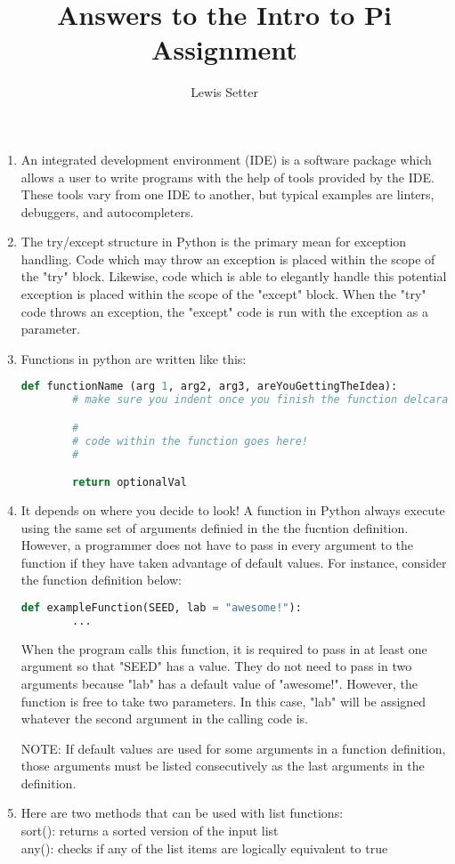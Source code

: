 \documentclass{article}
\title{Answers to the Intro to Pi Assignment}
\author{Lewis Setter}
\begin{document}
\maketitle

\begin{enumerate}
\item
An integrated development environment (IDE) is a software package which allows a user
to write programs with the help of tools provided by the IDE. These tools vary from
one IDE to another, but typical examples are linters, debuggers, and autocompleters.

\item
The try/except structure in Python is the primary mean for exception handling. Code 
which may throw an exception is placed within the scope of the "try" block. Likewise,
code which is able to elegantly handle this potential exception is placed within the 
scope of the "except" block. When the "try" code throws an exception, the "except"
code is run with the exception as a parameter.

\item
Functions in python are written like this:
\begin{lstlisting}[language=Python]
    def functionName (arg 1, arg2, arg3, areYouGettingTheIdea):
        # make sure you indent once you finish the function delcaration

        #
        # code within the function goes here!
        #

        return optionalVal
\end{lstlisting}
\item
It depends on where you decide to look!
A function in Python always execute using the same set of arguments definied in the
the fucntion definition. However, a programmer does not have to pass in every argument
to the function if they have taken advantage of default values. For instance, consider
the function definition below:
\begin{lstlisting}[language=Python]
    def exampleFunction(SEED, lab = "awesome!"):
        ...
\end{lstlisting}
When the program calls this function, it is required to pass in at least one argument
so that "SEED" has a value. They do not need to pass in two arguments because "lab"
has a default value of "awesome!". However, the function is free to take two parameters.
In this case, "lab" will be assigned whatever the second argument in the calling code is.

NOTE: If default values are used for some arguments in a function definition, those
arguments must be listed consecutively as the last arguments in the definition.

\item
Here are two methods that can be used with list functions:
\\
sort(): returns a sorted version of the input list\\
any(): checks if any of the list items are logically equivalent to true\\

\end{enumerate}
\end{document}
